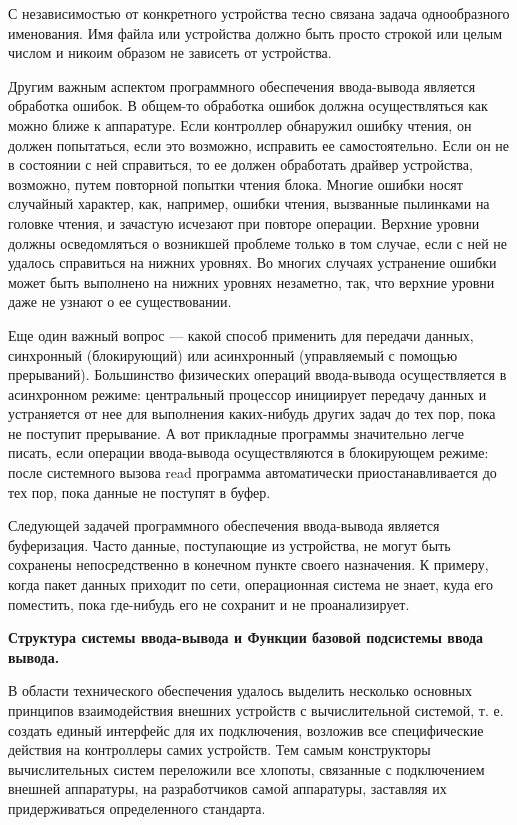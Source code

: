 С независимостью от конкретного устройства тесно связана задача однообразного именования. Имя файла или устройства должно быть просто строкой или целым числом и никоим образом не зависеть от устройства.

Другим важным аспектом программного обеспечения ввода-вывода является обработка ошибок. В общем-то обработка ошибок должна осуществляться как можно ближе к аппаратуре. Если контроллер обнаружил ошибку чтения, он должен попытаться, если это возможно, исправить ее самостоятельно. Если он не в состоянии с ней справиться, то ее должен обработать драйвер устройства, возможно, путем повторной попытки чтения блока. Многие ошибки носят случайный характер, как, например, ошибки чтения, вызванные пылинками на головке чтения, и зачастую исчезают при повторе операции. Верхние уровни должны осведомляться о возникшей проблеме только в том случае, если с ней не удалось справиться на нижних уровнях. Во многих случаях устранение ошибки может быть выполнено на нижних уровнях незаметно, так, что верхние уровни даже не узнают о ее существовании.

Еще один важный вопрос — какой способ применить для передачи данных, синхронный (блокирующий) или асинхронный (управляемый с помощью прерываний). Большинство физических операций ввода-вывода осуществляется в асинхронном режиме: центральный процессор инициирует передачу данных и устраняется от нее для выполнения каких-нибудь других задач до тех пор, пока не поступит прерывание. А вот прикладные программы значительно легче писать, если операции ввода-вывода осуществляются в блокирующем режиме: после системного вызова read программа автоматически приостанавливается до тех пор, пока данные не поступят в буфер.

Следующей задачей программного обеспечения ввода-вывода является буферизация. Часто данные, поступающие из устройства, не могут быть сохранены непосредственно в конечном пункте своего назначения. К примеру, когда пакет данных приходит по сети, операционная система не знает, куда его поместить, пока где-нибудь его не сохранит и не проанализирует.

\begin{center}{\bfseries Структура системы ввода-вывода и Функции базовой подсистемы ввода вывода.}
\end{center}

В области технического обеспечения удалось выделить несколько основных принципов взаимодействия внешних устройств с вычислительной системой, т. е. создать единый интерфейс для их подключения, возложив все специфические действия на контроллеры самих устройств. Тем самым конструкторы вычислительных систем переложили все хлопоты, связанные с подключением внешней аппаратуры, на разработчиков самой аппаратуры, заставляя их придерживаться определенного стандарта.

